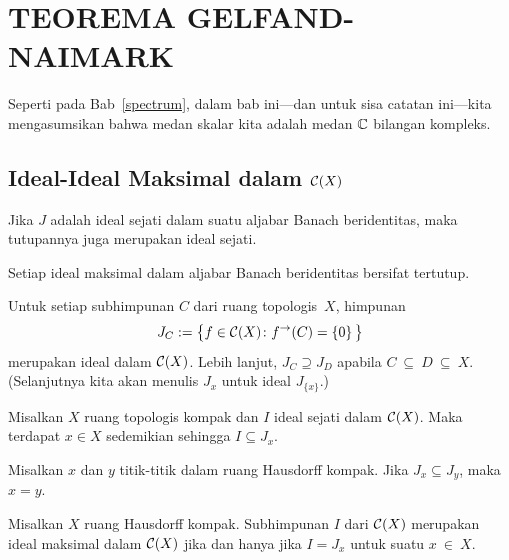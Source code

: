 \chapter{TEOREMA GELFAND-NAIMARK}\label{Gelfand_Naimark}

Seperti pada Bab~\ref{spectrum}, dalam bab ini---dan untuk sisa catatan ini---kita mengasumsikan bahwa medan
skalar kita adalah medan $\mathbb{C}$ bilangan kompleks.



\section{Ideal-Ideal Maksimal dalam $\mathcal{C}(X)$}
\begin{prop}\label{0006801} Jika $J$ adalah ideal sejati dalam suatu aljabar Banach beridentitas, maka
tutupannya juga merupakan ideal sejati.
\end{prop}

\begin{cor} Setiap ideal maksimal dalam aljabar Banach beridentitas bersifat tertutup.
\end{cor}

\begin{exam} Untuk setiap subhimpunan $C$ dari ruang topologis~$X$, himpunan
   \[ J_C := \bigl\{f \in \mathcal{C}(X)\colon f^{\rightarrow}(C) = \{0\}\,\bigr\} \]
merupakan ideal dalam $\mathcal{C}(X)$. Lebih lanjut, $J_C \supseteq J_D$ apabila
$C~\subseteq~D~\subseteq~X$. (Selanjutnya kita akan menulis $J_x$ untuk ideal
$J_{\{x\}}$.)
\end{exam}

\begin{prop}\label{0006832} Misalkan $X$ ruang topologis kompak dan $I$ ideal sejati
dalam $\mathcal{C}(X)$. Maka terdapat $x \in X$ sedemikian sehingga $I \subseteq J_x$.
\end{prop}

\begin{prop} Misalkan $x$ dan $y$ titik-titik dalam ruang Hausdorff kompak. Jika $J_x \subseteq J_y$,
maka $x = y$.
\end{prop}

\begin{prop}\label{0006836} Misalkan $X$ ruang Hausdorff kompak. Subhimpunan $I$ dari $\mathcal{C}(X)$
merupakan ideal maksimal dalam $\mathcal{C}(X)$ jika dan hanya jika $I = J_x$ untuk suatu $x~\in~X$.
\end{prop}

